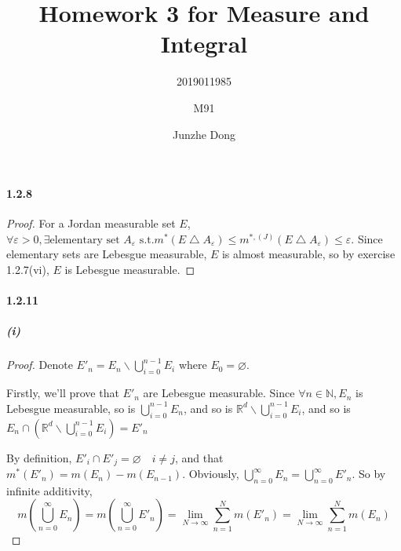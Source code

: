 \documentclass{article}
\author{2019011985\and M91\and Junzhe Dong}
\title{Homework 3 for Measure and Integral}
\begin{document}
\maketitle
\newcommand{\st}{\text{ s.t.}}


\paragraph{1.2.8}
\begin{proof}
For a Jordan measurable set $E$, $\forall \varepsilon >0, \exists \text{elementary set }A_{\varepsilon} \st m^*(E\bigtriangleup A_{\varepsilon})\leq m^{*,(J)}(E\bigtriangleup A_{\varepsilon})\leq\varepsilon$. Since elementary sets are Lebesgue measurable, $E$ is almost measurable, so by exercise 1.2.7(vi), $E$ is Lebesgue measurable. 
\end{proof}

\paragraph{1.2.11}
\subparagraph{(i)}
\begin{proof}
Denote $E'_n=E_n\backslash \bigcup_{i=0}^{n-1}E_i$ where $E_0=\varnothing$.

Firstly, we'll prove that $E'_n$ are Lebesgue measurable. Since $\forall n\in \mathbb{N}, E_n$ is Lebesgue measurable, so is $\bigcup_{i=0}^{n-1}E_n$, and so is $\mathbb{R}^d\backslash \bigcup_{i=0}^{n-1}E_i$, and so is $E_n\cap (\mathbb{R}^d\backslash \bigcup_{i=0}^{n-1}E_i)=E'_n$

By definition, $E'_i\cap E'_j=\varnothing\quad i\neq j$, and that $m^*(E'_n)=m(E_n)-m(E_{n-1})$. Obviously, $\bigcup\limits_{n=0}^{\infty}E_n=\bigcup_{n=0}^{\infty}E'_n$. So by infinite additivity, 
\[m(\bigcup_{n=0}^{\infty}E_n)=m(\bigcup_{n=0}^{\infty}E'_n)=\lim_{N\to\infty}\sum_{n=1}^N m(E'_n)=\lim_{N\to\infty}\sum_{n=1}^N m(E_n)\]
\end{proof}
\end{document}
